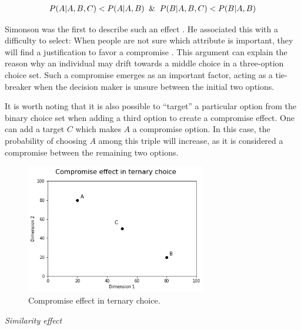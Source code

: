 \documentclass[a4paper,12pt]{article}
\newcommand{\citeyearonly}[1]{\citeyearpar{#1}}
\begin{document}
\begin{align}\label{eq:compromiseProbability}
    P(A|A,B,C) < P(A|A,B) \And P(B|A,B,C) < P(B|A,B)
\end{align}

Simonson was the first to describe such an effect \citeyearonly{simonson89}. He associated this with a difficulty to select: When people are not sure which attribute is important, they will find a justification to favor a compromise \citep{simonson89}. This argument can explain the reason why an individual may drift towards a middle choice in a three-option choice set. Such a compromise emerges as an important factor, acting as a tie-breaker when the decision maker is unsure between the initial two options. 

It is worth noting that it is also possible to ``target'' a particular option from the binary choice set when adding a third option to create a compromise effect. One can add a target $C$ which makes $A$ a compromise option. In this case, the probability of choosing $A$ among this triple will increase, as it is considered a compromise between the remaining two options. 

\begin{figure}[h]
    \centering
    \includegraphics[width=0.7\textwidth]{staticFiles/compromiseEffect.png}
    \caption{Compromise effect in ternary choice.} %
    \label{fig:compromiseEffect} %

\end{figure}

\textit{Similarity effect}
\end{document}
